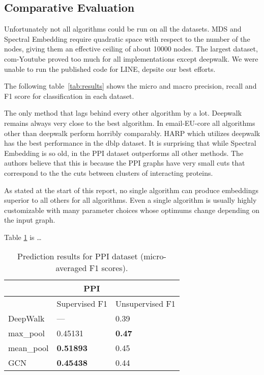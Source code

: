 \subsection{Comparative Evaluation}

Unfortunately not all algorithms could be run on all the datasets. MDS and Spectral Embedding
require quadratic space with respect to the number of the nodes, giving them an effective ceiling of
about 10000 nodes. The largest dataset, com-Youtube proved too much for all implementations except
deepwalk. We were unable to run the published code for LINE, depsite our best efforts.

The following table~\ref{tab:results} shows the micro and macro precision, recall and F1 score for
classification in each dataset.



The only method that lags behind every other algorithm by a lot. Deepwalk remains always very close
to the best algorithm. In email-EU-core all algorithms other than deepwalk perform horribly
comparably. HARP which utilizes deepwalk has the best performance in the dblp dataset. It is
surprising that while Spectral Embedding is so old, in the PPI dataset outperforms all other
methods. The authors believe that this is because the PPI graphs have very small cuts that
correspond to the the cuts between clusters of interacting proteins.

As stated at the start of this report, no single algorithm can produce embeddings superior to all
others for all algorithms. Even a single algorithm is usually highly customizable with many
parameter choices whose optimums change depending on the input graph.



Table \ref{table:1} is \dots
\begin{table}[h!]
\centering
\caption{Prediction results for PPI dataset (micro-averaged F1 scores). \newline}
\begin{tabular}{|p{3cm}||p{3cm}|p{3cm}|}
 \hline
 \multicolumn{3}{|c|}{\textbf{PPI}} \\
 \hline
 & Supervised F1 &Unsupervised F1\\
 \hline\hline
 DeepWalk   & ---    &0.39\\
 max\_pool &   0.45131  & \textbf{0.47} \\
 mean\_pool &\textbf{0.51893} & 0.45\\
 GCN    &\textbf{0.45438} & 0.44\\
 \hline
\end{tabular}\\
\label{table:1}
\end{table}

